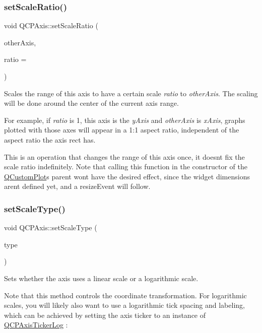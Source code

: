 \subsubsection{\texorpdfstring{set\+Scale\+Ratio()}{setScaleRatio()}}
{\footnotesize\ttfamily void Q\+C\+P\+Axis\+::set\+Scale\+Ratio (\begin{DoxyParamCaption}\item[{const \hyperlink{classQCPAxis}{Q\+C\+P\+Axis} $\ast$}]{other\+Axis,  }\item[{double}]{ratio = {} }\end{DoxyParamCaption})}

Scales the range of this axis to have a certain scale {\itshape ratio} to {\itshape other\+Axis}. The scaling will be done around the center of the current axis range.

For example, if {\itshape ratio} is 1, this axis is the {\itshape y\+Axis} and {\itshape other\+Axis} is {\itshape x\+Axis}, graphs plotted with those axes will appear in a 1\+:1 aspect ratio, independent of the aspect ratio the axis rect has.

This is an operation that changes the range of this axis once, it doesn\textquotesingle{}t fix the scale ratio indefinitely. Note that calling this function in the constructor of the \hyperlink{classQCustomPlot}{Q\+Custom\+Plot}\textquotesingle{}s parent won\textquotesingle{}t have the desired effect, since the widget dimensions aren\textquotesingle{}t defined yet, and a resize\+Event will follow. \mbox{\label{classQCPAxis_adef29cae617af4f519f6c40d1a866ca6}} 
\subsubsection{\texorpdfstring{set\+Scale\+Type()}{setScaleType()}}
{\footnotesize\ttfamily void Q\+C\+P\+Axis\+::set\+Scale\+Type (\begin{DoxyParamCaption}\item[{\hyperlink{classQCPAxis_a36d8e8658dbaa179bf2aeb973db2d6f0}{Q\+C\+P\+Axis\+::\+Scale\+Type}}]{type }\end{DoxyParamCaption})}

Sets whether the axis uses a linear scale or a logarithmic scale.

Note that this method controls the coordinate transformation. For logarithmic scales, you will likely also want to use a logarithmic tick spacing and labeling, which can be achieved by setting the axis ticker to an instance of \hyperlink{classQCPAxisTickerLog}{Q\+C\+P\+Axis\+Ticker\+Log} \+:


